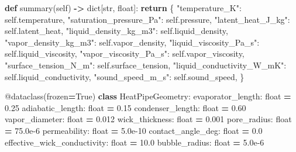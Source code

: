 \documentclass[
  12pt,a4paper,oneside]{report}
\newenvironment{Shaded}{\begin{snugshade}}{\end{snugshade}}
\newcommand{\AttributeTok}[1]{\textcolor[rgb]{0.77,0.63,0.00}{#1}}
\newcommand{\BuiltInTok}[1]{#1}
\newcommand{\ControlFlowTok}[1]{\textcolor[rgb]{0.13,0.29,0.53}{\textbf{#1}}}
\newcommand{\FloatTok}[1]{\textcolor[rgb]{0.00,0.00,0.81}{#1}}
\newcommand{\KeywordTok}[1]{\textcolor[rgb]{0.13,0.29,0.53}{\textbf{#1}}}
\newcommand{\NormalTok}[1]{#1}
\newcommand{\OperatorTok}[1]{\textcolor[rgb]{0.81,0.36,0.00}{\textbf{#1}}}
\newcommand{\StringTok}[1]{\textcolor[rgb]{0.31,0.60,0.02}{#1}}
\newcommand{\VariableTok}[1]{\textcolor[rgb]{0.00,0.00,0.00}{#1}}
\begin{document}
\begin{Shaded}
\begin{Highlighting}[]
    \KeywordTok{def}\NormalTok{ summary(}\VariableTok{self}\NormalTok{) }\OperatorTok{{-}\textgreater{}} \BuiltInTok{dict}\NormalTok{[}\BuiltInTok{str}\NormalTok{, }\BuiltInTok{float}\NormalTok{]:}
        \ControlFlowTok{return}\NormalTok{ \{}
            \StringTok{"temperature\_K"}\NormalTok{: }\VariableTok{self}\NormalTok{.temperature,}
            \StringTok{"saturation\_pressure\_Pa"}\NormalTok{: }\VariableTok{self}\NormalTok{.pressure,}
            \StringTok{"latent\_heat\_J\_kg"}\NormalTok{: }\VariableTok{self}\NormalTok{.latent\_heat,}
            \StringTok{"liquid\_density\_kg\_m3"}\NormalTok{: }\VariableTok{self}\NormalTok{.liquid\_density,}
            \StringTok{"vapor\_density\_kg\_m3"}\NormalTok{: }\VariableTok{self}\NormalTok{.vapor\_density,}
            \StringTok{"liquid\_viscosity\_Pa\_s"}\NormalTok{: }\VariableTok{self}\NormalTok{.liquid\_viscosity,}
            \StringTok{"vapor\_viscosity\_Pa\_s"}\NormalTok{: }\VariableTok{self}\NormalTok{.vapor\_viscosity,}
            \StringTok{"surface\_tension\_N\_m"}\NormalTok{: }\VariableTok{self}\NormalTok{.surface\_tension,}
            \StringTok{"liquid\_conductivity\_W\_mK"}\NormalTok{: }\VariableTok{self}\NormalTok{.liquid\_conductivity,}
            \StringTok{"sound\_speed\_m\_s"}\NormalTok{: }\VariableTok{self}\NormalTok{.sound\_speed,}
\NormalTok{        \}}


\AttributeTok{@dataclass}\NormalTok{(frozen}\OperatorTok{=}\VariableTok{True}\NormalTok{)}
\KeywordTok{class}\NormalTok{ HeatPipeGeometry:}
\NormalTok{    evaporator\_length: }\BuiltInTok{float} \OperatorTok{=} \FloatTok{0.25}
\NormalTok{    adiabatic\_length: }\BuiltInTok{float} \OperatorTok{=} \FloatTok{0.15}
\NormalTok{    condenser\_length: }\BuiltInTok{float} \OperatorTok{=} \FloatTok{0.60}
\NormalTok{    vapor\_diameter: }\BuiltInTok{float} \OperatorTok{=} \FloatTok{0.012}
\NormalTok{    wick\_thickness: }\BuiltInTok{float} \OperatorTok{=} \FloatTok{0.001}
\NormalTok{    pore\_radius: }\BuiltInTok{float} \OperatorTok{=} \FloatTok{75.0e{-}6}
\NormalTok{    permeability: }\BuiltInTok{float} \OperatorTok{=} \FloatTok{5.0e{-}10}
\NormalTok{    contact\_angle\_deg: }\BuiltInTok{float} \OperatorTok{=} \FloatTok{0.0}
\NormalTok{    effective\_wick\_conductivity: }\BuiltInTok{float} \OperatorTok{=} \FloatTok{10.0}
\NormalTok{    bubble\_radius: }\BuiltInTok{float} \OperatorTok{=} \FloatTok{5.0e{-}6}


\end{Highlighting}
\end{Shaded}
\end{document}
